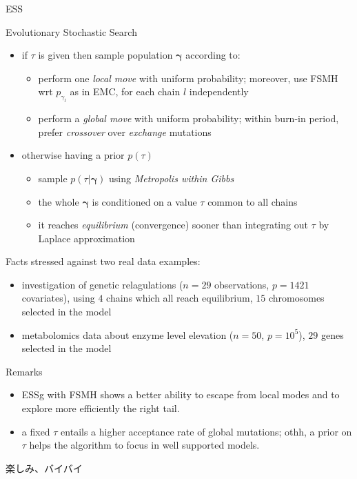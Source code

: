 \documentclass{beamer}
\newcommand{\vect}[1]{\boldsymbol{#1}}
\begin{document}
\begin{frame}{ESS}
\begin{block}{Evolutionary Stochastic Search}
    \begin{itemize}
        \item if $\tau$ is given then sample population $\vect{\gamma}$ according to: 
            \begin{itemize}
                \item perform one \emph{local move} with uniform probability; moreover, 
                    use FSMH wrt $p_{\gamma_{l}}$ as in EMC, for each chain $l$ independently
                \item perform a \emph{global move} with uniform probability; within burn-in period, prefer
                    \emph{crossover} over \emph{exchange} mutations 
            \end{itemize}
        \item otherwise having a prior $p(\tau)$ 
            \begin{itemize}
                \item sample $p(\tau|\vect{\gamma})$ using \emph{Metropolis within Gibbs}
                \item the whole $\vect{\gamma}$ is conditioned on a value $\tau$ common to all chains
                \item it reaches \emph{equilibrium} (convergence) sooner than integrating out $\tau$ by Laplace approximation
            \end{itemize}
    \end{itemize}
\end{block}
\end{frame}

\begin{frame}{Facts}
stressed against two real data examples:
\begin{itemize}
    \item investigation of genetic relagulations ($n=29$ observations, $p=1421$
    covariates), using $4$ chains which all reach equilibrium, $15$ chromosomes
    selected in the model
    \item metabolomics data about enzyme level elevation ($n=50$, $p=10^{5}$), $29$
    genes selected in the model
\end{itemize}
\vfill
\begin{block}{Remarks}
\begin{itemize}
    \item ESSg with FSMH shows a better ability to escape from local modes and
    to explore more efficiently the right tail.
    \item a fixed $\tau$ entails a higher acceptance rate of global mutations;
    othh, a prior on $\tau$ helps the algorithm to focus in well supported models.
\end{itemize}
\end{block}
\end{frame}

\begin{frame}{ }
\Huge
\begin{CJK}{UTF8}{min}
楽しみ、バイバイ
\end{CJK}
\end{frame}
\end{document}
